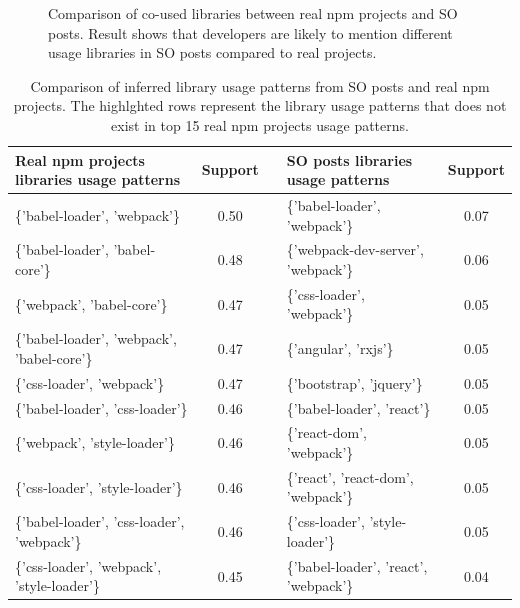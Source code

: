 \documentclass[paper]{ieice}
\begin{document}
\begin{figure}[t]
{{
        
    }}
    
 
    \caption{Comparison of co-used libraries between real npm projects and SO posts. Result shows that developers are likely to mention different usage libraries in SO posts compared to real projects.}
   
    \label{fig:PS1}
    \end{figure}


\begin{table}[t]
\centering
	\caption{Comparison of inferred library usage patterns from SO posts and real npm projects. The highlghted rows represent the library usage patterns that does not exist in top 15 real npm projects usage patterns.}
	\label{tab:ps2}
\begin{tabular}{@{}lc|llc@{}}
\toprule
Real npm projects libraries usage patterns & Support &  & SO posts libraries usage patterns & Support \\ \midrule
\{'babel-loader', 'webpack'\} & 0.50 &  & \{'babel-loader', 'webpack'\} & 0.07 \\
\{'babel-loader', 'babel-core'\} & 0.48 &  & \cellcolor[HTML]{999999}\{'webpack-dev-server', 'webpack'\} & 0.06 \\
\{'webpack', 'babel-core'\} & 0.47 &  & \{'css-loader', 'webpack'\} & 0.05 \\
\{'babel-loader', 'webpack', 'babel-core'\} & 0.47 &  & \cellcolor[HTML]{999999}\{'angular', 'rxjs'\} & 0.05 \\
\{'css-loader', 'webpack'\} & 0.47 &  & \cellcolor[HTML]{999999}\{'bootstrap', 'jquery'\} & 0.05 \\
\{'babel-loader', 'css-loader'\} & 0.46 &  & \cellcolor[HTML]{999999}\{'babel-loader', 'react'\} & 0.05 \\
\{'webpack', 'style-loader'\} & 0.46 &  & \cellcolor[HTML]{999999}\{'react-dom', 'webpack'\} & 0.05 \\
\{'css-loader', 'style-loader'\} & 0.46 &  & \cellcolor[HTML]{999999}\{'react', 'react-dom', 'webpack'\} & 0.05 \\
\{'babel-loader', 'css-loader', 'webpack'\} & 0.46 &  & \{'css-loader', 'style-loader'\} & 0.05 \\
\{'css-loader', 'webpack', 'style-loader'\} & 0.45 &  & \cellcolor[HTML]{999999}\{'babel-loader', 'react', 'webpack'\} & 0.04 \\

\end{tabular}
\end{table}
\end{document}

